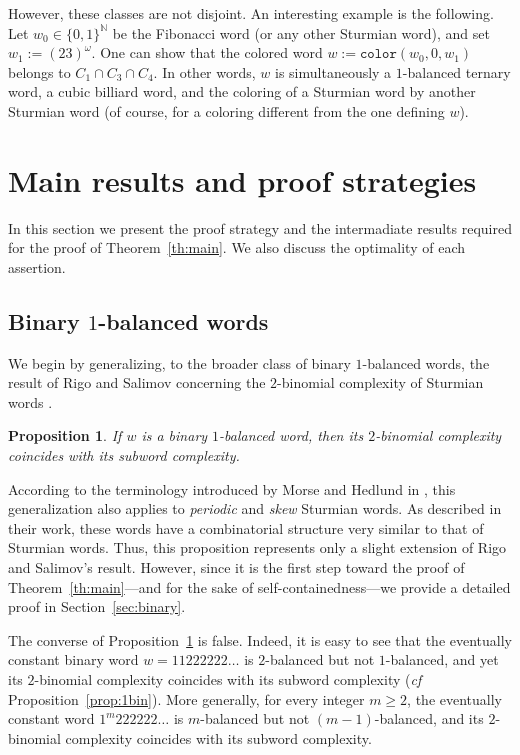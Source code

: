 \documentclass{template_arxiv}
\newtheorem{proposition}[lemma]{Proposition}
\theoremstyle{definition}
\newcommand{\N}{\mathbb{N}}
\newcommand{\colour}{\mathtt{color}}
\begin{document}
However, these classes are not disjoint. An interesting example is the following. Let $w_0\in\{0,1\}^\N$ be the Fibonacci word (or any other Sturmian word), and set $w_1:=(23)^\omega$. One can show that the colored word $w:=\colour(w_0,0,w_1)$ belongs to $C_1\cap C_3\cap C_4$. In other words, $w$ is simultaneously a $1$-balanced ternary word, a cubic billiard word, and the coloring of a Sturmian word by another Sturmian word (of course, for a coloring different from the one defining $w$).



\section{Main results and proof strategies}\label{sec:main}

In this section we present the proof strategy and the intermadiate results required for the proof of Theorem~\ref{th:main}. We also discuss the optimality of each assertion.

\subsection{Binary $1$-balanced words}

We begin by generalizing, to the broader class of binary $1$-balanced words, the result of Rigo and Salimov concerning the $2$-binomial complexity of Sturmian words \cite[Theorem~7]{RS15}.

\begin{proposition}\label{prop:binary}
If $w$ is a binary $1$-balanced word, then its $2$-binomial complexity coincides with its subword complexity.
\end{proposition}

According to the terminology introduced by Morse and Hedlund in \cite{MH40}, this generalization also applies to \emph{periodic} and \emph{skew} Sturmian words. As described in their work, these words have a combinatorial structure very similar to that of Sturmian words. Thus, this proposition represents only a slight extension of Rigo and Salimov's result. However, since it is the first step toward the proof of Theorem~\ref{th:main}---and for the sake of self-containedness---we provide a detailed proof in Section~\ref{sec:binary}.

The converse of Proposition~\ref{prop:binary} is false. Indeed, it is easy to see that the eventually constant binary word $w=11222222\ldots$ is $2$-balanced but not $1$-balanced, and yet its $2$-binomial complexity coincides with its subword complexity (\emph{cf} Proposition~\ref{prop:1bin}). More generally, for every integer $m\geq 2$, the eventually constant word $1^m 222222\ldots$ is $m$-balanced but not $(m-1)$-balanced, and its $2$-binomial complexity coincides with its subword complexity.
\end{document}
